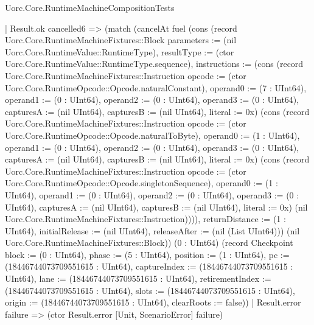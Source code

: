 \begin{lexlean}{Uorc.Core.RuntimeMachineCompositionTests}
\begin{semanticmodule}
{                | Result.ok cancelled6 => (match (cancelAt fuel (cons (record Uorc.Core.RuntimeMachineFixtures::Block {parameters := (nil Uorc.Core.RuntimeValue::RuntimeType), resultType := (ctor Uorc.Core.RuntimeValue::RuntimeType.sequence), instructions := (cons (record Uorc.Core.RuntimeMachineFixtures::Instruction {opcode := (ctor Uorc.Core.RuntimeOpcode::Opcode.naturalConstant), operand0 := (7 : UInt64), operand1 := (0 : UInt64), operand2 := (0 : UInt64), operand3 := (0 : UInt64), capturesA := (nil UInt64), capturesB := (nil UInt64), literal := 0x}) (cons (record Uorc.Core.RuntimeMachineFixtures::Instruction {opcode := (ctor Uorc.Core.RuntimeOpcode::Opcode.naturalToByte), operand0 := (1 : UInt64), operand1 := (0 : UInt64), operand2 := (0 : UInt64), operand3 := (0 : UInt64), capturesA := (nil UInt64), capturesB := (nil UInt64), literal := 0x}) (cons (record Uorc.Core.RuntimeMachineFixtures::Instruction {opcode := (ctor Uorc.Core.RuntimeOpcode::Opcode.singletonSequence), operand0 := (1 : UInt64), operand1 := (0 : UInt64), operand2 := (0 : UInt64), operand3 := (0 : UInt64), capturesA := (nil UInt64), capturesB := (nil UInt64), literal := 0x}) (nil Uorc.Core.RuntimeMachineFixtures::Instruction)))), returnDistance := (1 : UInt64), initialRelease := (nil UInt64), releaseAfter := (nil (List UInt64))}) (nil Uorc.Core.RuntimeMachineFixtures::Block)) (0 : UInt64) (record Checkpoint {block := (0 : UInt64), phase := (5 : UInt64), position := (1 : UInt64), pc := (18446744073709551615 : UInt64), captureIndex := (18446744073709551615 : UInt64), lane := (18446744073709551615 : UInt64), retirementIndex := (18446744073709551615 : UInt64), slots := (18446744073709551615 : UInt64), origin := (18446744073709551615 : UInt64), clearRoots := false}))
                  | Result.error failure => (ctor Result.error [Unit, ScenarioError] failure)
}
\end{semanticmodule}
\end{lexlean}
